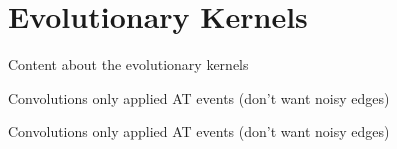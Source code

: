 \chapter{Evolutionary Kernels}
\label{ch:evolution}

Content about the evolutionary kernels

Convolutions only applied AT events (don't want noisy edges)

Convolutions only applied AT events (don't want noisy edges)
